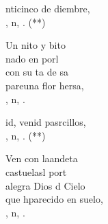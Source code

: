 \begin{cancion}%
	\begin{chorus}%
	nticinco de diembre,\\
	, n, . (**)\\
	\end{chorus}%
	Un nito y bito \\
	 nado en  porl\\
	con su ta de sa\\
	pareuna flor hersa,\\
	, n, .\\
	\begin{chorus}%
	id, venid pasrcillos,\\
	, n, . (**)\\
	\end{chorus}%
	Ven con laandeta\\
	castuelasl port \\
	alegra Dios d Cielo\\
	que hparecido en  suelo,\\
	, n, .\\
\end{cancion}%
